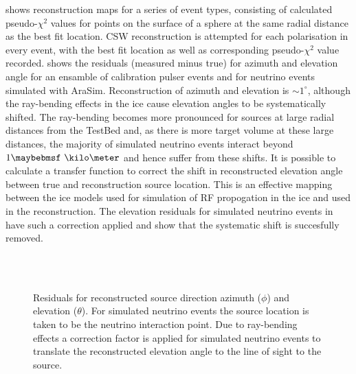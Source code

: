  shows reconstruction maps for a series of event types, consisting of calculated pseudo-$\chi^{2}$ values for points on the surface of a sphere at the same radial distance as the best fit location. CSW reconstruction is attempted for each polarisation in every event, with the best fit location as well as corresponding pseudo-$\chi^{2}$ value recorded.  shows the residuals (measured minus true) for azimuth and elevation angle for an ensamble of calibration pulser events and for neutrino events simulated with AraSim. Reconstruction of azimuth and elevation is $\sim 1^{\circ}$, although the ray-bending effects in the ice cause elevation angles to be systematically shifted. The ray-bending becomes more pronounced for sources at large radial distances from the TestBed and, as there is more target volume at these large distances, the majority of simulated neutrino events interact beyond $1 \km$ and hence suffer from these shifts. It is possible to calculate a transfer function to correct the shift in reconstructed elevation angle between true and reconstruction source location. This is an effective mapping between the ice models used for simulation of RF propogation in the ice and used in the reconstruction. The elevation residuals for simulated neutrino events in  have such a correction applied and show that the systematic shift is succesfully removed.


\begin{figure}[htpb]
  \hfill
  \\
  \hfill
  \\
  \hfill
  \caption{Residuals for reconstructed source direction azimuth ($\phi$) and elevation ($\theta$). For simulated neutrino events the source location is taken to be the neutrino interaction point. Due to ray-bending effects a correction factor is applied for simulated neutrino events to translate the reconstructed elevation angle to the line of sight to the source.}
  \label{fig:analysis:Reconstructed:CSW-Residuals}
\end{figure}

